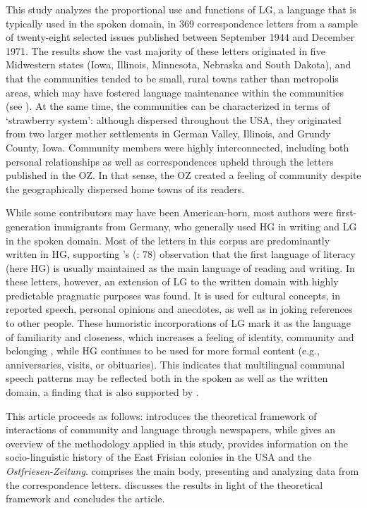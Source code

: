 \documentclass[output=paper]{langsci/langscibook}
\begin{document}
This study analyzes the proportional use and functions of LG, a language that is typically used in the spoken domain, in 369 correspondence letters from a sample of twenty-eight selected issues published between September 1944 and December 1971. The results show the vast majority of these letters originated in five Midwestern states (Iowa, Illinois, Minnesota, Nebraska and South Dakota), and that the communities tended to be small, rural towns rather than metropolis areas, which may have fostered language maintenance within the communities (see \citealt{Louden2006}). At the same time, the communities can be characterized in terms of  ‘strawberry system’: although dispersed throughout the USA, they originated from two larger mother settlements in German Valley, Illinois, and Grundy County, Iowa. Community members were highly interconnected, including both personal relationships as well as correspondences upheld through the letters published in the OZ. In that sense, the OZ created a feeling of community despite the geographically dispersed home towns of its readers.

While some contributors may have been American-born, most authors were first-generation immigrants from Germany, who generally used HG in writing and LG in the spoken domain. Most of the letters in this corpus are predominantly written in HG, supporting \citeauthor{Fishman1965}'s (\citeyear{Fishman1965}: 78) observation that the first language of literacy (here HG) is usually maintained as the main language of reading and writing. In these letters, however, an extension of LG to the written domain with highly predictable pragmatic purposes was found. It is used for cultural concepts, in reported speech, personal opinions and anecdotes, as well as in joking references to other people. These humoristic incorporations of LG mark it as the language of familiarity and closeness, which increases a feeling of identity, community and belonging \citep{Pavlenko2002}, while HG continues to be used for more formal content (e.g., anniversaries, visits, or obituaries). This indicates that multilingual communal speech patterns may be reflected both in the spoken as well as the written domain, a finding that is also supported by .%

This article proceeds as follows:  introduces the theoretical framework of interactions of community and language through newspapers, while  gives an overview of the methodology applied in this study, provides information on the socio-linguistic history of the East Frisian colonies in the USA and the \textit{Ostfriesen-Zeitung}.  comprises the main body, presenting and analyzing data from the correspondence letters.  discusses the results in light of the theoretical framework and concludes the article.
\end{document}
